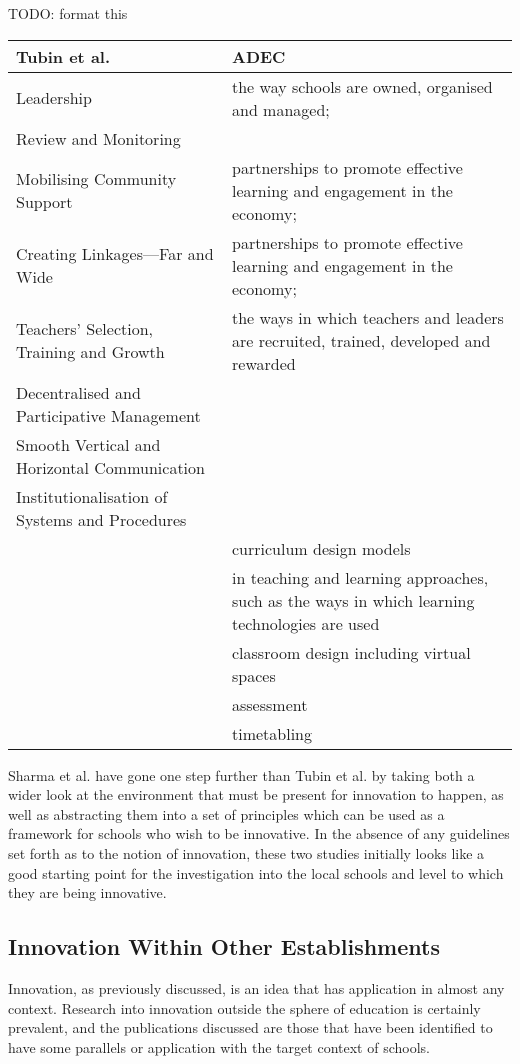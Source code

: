 TODO: format this
\begin{center}
    \begin{tabular}{ | l | p{5cm} |}
    Tubin et al.  & ADEC \\ \hline
    Leadership & the way schools are owned, organised and managed;  \\ \hline
    Review and Monitoring  &  \\ \hline
    Mobilising Community Support &  partnerships to promote effective learning and engagement in the economy; \\ \hline
    Creating Linkages—Far and Wide &  partnerships to promote effective learning and engagement in the economy; \\ \hline
    Teachers’ Selection, Training and Growth & the ways in which teachers and leaders are recruited, trained, developed and rewarded \\ \hline
    Decentralised and Participative Management &  \\ \hline
    Smooth Vertical and Horizontal Communication &  \\ \hline
    Institutionalisation of Systems and Procedures &  \\ \hline
     & curriculum design models \\ \hline
     & in teaching and learning approaches, such as the ways in which learning technologies are used \\ \hline
     & classroom design including virtual spaces \\ \hline
     & assessment \\ \hline
     & timetabling \\ \hline
    \end{tabular} 
\end{center}


Sharma et al. have gone one step further than Tubin et al. by taking both a wider look at the environment that must be present for innovation to happen, as well as abstracting them into a set of principles which can be used as a framework for schools who wish to be innovative. In the absence of any guidelines set forth as to the notion of innovation, these two studies initially looks like a good starting point for the investigation into the local schools and level to which they are being innovative.

\subsection{Innovation Within Other Establishments}
Innovation, as previously discussed, is an idea that has application in almost any context. Research into innovation outside the sphere of education is certainly prevalent, and the publications discussed are those that have been identified to have some parallels or application with the target context of schools.

